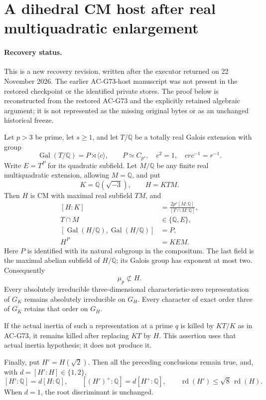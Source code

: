 \section{A dihedral CM host after real multiquadratic enlargement}
\label{sec:cubic-dihedral-cm-host}

\paragraph{Recovery status.}
This is a new recovery revision, written after the executor returned on
22 November 2026.  The earlier AC-G73-host manuscript was not present in
the restored checkpoint or the identified private stores.  The proof
below is reconstructed from the restored AC-G73 and the explicitly
retained algebraic argument; it is not represented as the missing
original bytes or as an unchanged historical freeze.

\begin{proposition}
\label{AC-G73-host}
Let \(p>3\) be prime, let \(s\geq1\), and let \(T/\mathbb Q\) be a
totally real Galois extension with group
\[
 \operatorname{Gal}(T/\mathbb Q)
       =P\rtimes\langle c\rangle,\qquad
 P\simeq C_{p^s},\quad c^2=1,\quad crc^{-1}=r^{-1}.
 \tag{G73H.1}
\]
Write \(E=T^P\) for its quadratic subfield.  Let \(M/\mathbb Q\)
be any finite real multiquadratic extension, allowing \(M=\mathbb Q\),
and put
\[
                  K=\mathbb Q(\sqrt{-3}),\qquad H=KTM.
\]
Then \(H\) is CM with maximal real subfield \(TM\), and
\[
 \begin{split}
 [H:K]&=\frac{2p^s[M:\mathbb Q]}{[T\cap M:\mathbb Q]},\\
 T\cap M&\in\{\mathbb Q,E\},\\
 [\operatorname{Gal}(H/\mathbb Q),
       \operatorname{Gal}(H/\mathbb Q)]&=P,\\
                   H^{P}&=KEM .
 \end{split}                                                   \tag{G73H.2}
\]
Here \(P\) is identified with its natural subgroup in the compositum.
The last field is the maximal abelian subfield of \(H/\mathbb Q\);
its Galois group has exponent at most two.  Consequently
\[
                              \mu_p\not\subset H .              \tag{G73H.3}
\]
Every absolutely irreducible three-dimensional characteristic-zero
representation of \(G_K\) remains absolutely irreducible on \(G_H\).
Every character of exact order three of \(G_K\) retains that order
on \(G_H\).

If the actual inertia of such a representation at a prime \(q\)
is killed by \(KT/K\) as in AC-G73, it remains killed after replacing
\(KT\) by \(H\).  This assertion uses that actual inertia hypothesis;
it does not produce it.

Finally, put \(H'=H(\sqrt2)\).  Then all the preceding conclusions
remain true, and, with \(d=[H':H]\in\{1,2\}\),
\[
 [H':\mathbb Q]=d[H:\mathbb Q],\qquad
 [(H')^+:\mathbb Q]=d[H^+:\mathbb Q],\qquad
 \operatorname{rd}(H')\leq\sqrt8\,\operatorname{rd}(H).
 \tag{G73H.4}
\]
When \(d=1\), the root discriminant is unchanged.
\end{proposition}

